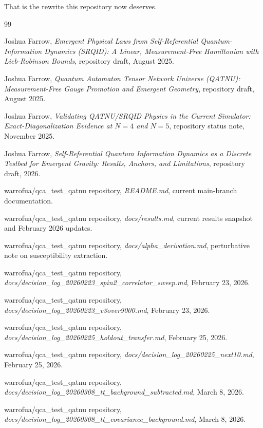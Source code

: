 \documentclass[11pt]{article}
\begin{document}
That is the rewrite this repository now deserves.

\begin{thebibliography}{99}

Joshua Farrow,
\emph{Emergent Physical Laws from Self-Referential Quantum-Information Dynamics (SRQID): A Linear, Measurement-Free Hamiltonian with Lieb-Robinson Bounds},
repository draft, August 2025.

Joshua Farrow,
\emph{Quantum Automaton Tensor Network Universe (QATNU): Measurement-Free Gauge Promotion and Emergent Geometry},
repository draft, August 2025.

Joshua Farrow,
\emph{Validating QATNU/SRQID Physics in the Current Simulator: Exact-Diagonalization Evidence at $N=4$ and $N=5$},
repository status note, November 2025.

Joshua Farrow,
\emph{Self-Referential Quantum Information Dynamics as a Discrete Testbed for Emergent Gravity: Results, Anchors, and Limitations},
repository draft, 2026.

warrofua/qca\_test\_qatnu repository,
\emph{README.md},
current main-branch documentation.

warrofua/qca\_test\_qatnu repository,
\emph{docs/results.md},
current results snapshot and February 2026 updates.

warrofua/qca\_test\_qatnu repository,
\emph{docs/alpha\_derivation.md},
perturbative note on susceptibility extraction.

warrofua/qca\_test\_qatnu repository,
\emph{docs/decision\_log\_20260223\_spin2\_correlator\_sweep.md},
February 23, 2026.

warrofua/qca\_test\_qatnu repository,
\emph{docs/decision\_log\_20260223\_v3over9000.md},
February 23, 2026.

warrofua/qca\_test\_qatnu repository,
\emph{docs/decision\_log\_20260225\_holdout\_transfer.md},
February 25, 2026.

warrofua/qca\_test\_qatnu repository,
\emph{docs/decision\_log\_20260225\_next10.md},
February 25, 2026.

warrofua/qca\_test\_qatnu repository,
\emph{docs/decision\_log\_20260308\_tt\_background\_subtracted.md},
March 8, 2026.

warrofua/qca\_test\_qatnu repository,
\emph{docs/decision\_log\_20260308\_tt\_covariance\_background.md},
March 8, 2026.


\end{thebibliography}
\end{document}
